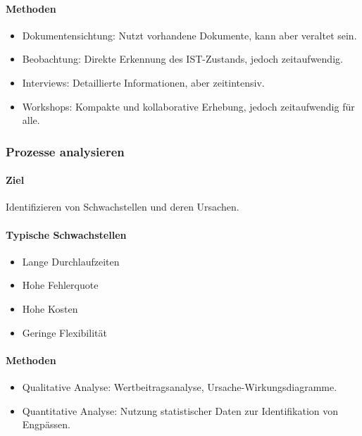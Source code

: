         \paragraph*{Methoden}
            \begin{itemize}
                \item Dokumentensichtung: Nutzt vorhandene Dokumente, kann aber veraltet sein.
                \item Beobachtung: Direkte Erkennung des IST-Zustands, jedoch zeitaufwendig.
                \item Interviews: Detaillierte Informationen, aber zeitintensiv.
                \item Workshops: Kompakte und kollaborative Erhebung, jedoch zeitaufwendig für alle.
            \end{itemize}

    \subsubsection{Prozesse analysieren}
        \paragraph*{Ziel}
            Identifizieren von Schwachstellen und deren Ursachen.
        \paragraph*{Typische Schwachstellen}
            \begin{itemize}
                \item Lange Durchlaufzeiten
                \item Hohe Fehlerquote
                \item Hohe Kosten
                \item Geringe Flexibilität
            \end{itemize}
        \paragraph*{Methoden}
            \begin{itemize}
                \item Qualitative Analyse: Wertbeitragsanalyse, Ursache-Wirkungsdiagramme.
                \item Quantitative Analyse: Nutzung statistischer Daten zur Identifikation von Engpässen.
            \end{itemize}

